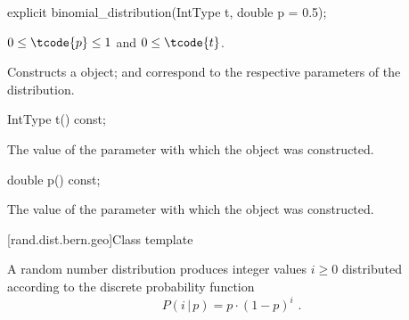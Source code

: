 %
\begin{itemdecl}
explicit binomial_distribution(IntType t, double p = 0.5);
\end{itemdecl}

\begin{itemdescr}
\pnum\requires
 $0 \leq \tcode{p} \leq 1$ and $0 \leq \tcode{t} $.

\pnum\effects Constructs a  object;
  and 
 correspond to the respective parameters of the distribution.
\end{itemdescr}

%
\begin{itemdecl}
IntType t() const;
\end{itemdecl}%
\begin{itemdescr}
\pnum\returns The value of the  parameter
 with which the object was constructed.
\end{itemdescr}

%
\begin{itemdecl}
double p() const;
\end{itemdecl}

\begin{itemdescr}
\pnum\returns The value of the  parameter
 with which the object was constructed.
\end{itemdescr}


[rand.dist.bern.geo]{Class template }
%
%

\pnum
A  random number distribution
produces integer values $i \geq 0$
distributed according to
the discrete probability function
%
%
\[ P(i\,|\,p) = p \cdot (1-p)^{i} \text{ .} \]

